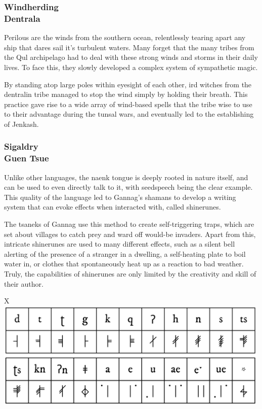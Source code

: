 
\subsubsection{Windherding\\ \small{Dentrala}} %
Perilous are the winds from the southern ocean, relentlessly tearing apart any ship that dares sail it's turbulent waters.
Many forget that the many tribes from the Qul archipelago had to deal with these strong winds and storms in their daily lives.
To face this, they slowly developed a complex system of sympathetic magic.

By standing atop large poles within eyesight of each other, ird witches from the dentralin tribe managed to stop the wind simply by holding their breath.
This practice gave rise to a wide array of wind-based spells that the tribe wise to use to their advantage during the tunsal wars, and eventually led to the establishing of Jenkash.

\subsubsection{Sigaldry\\ \small{Guen Tsue}} %
Unlike other languages, the naenk tongue is deeply rooted in nature itself, and can be used to even directly talk to it, with seedspeech being the clear example.
This quality of the language led to Gannag's shamans to develop a writing system that can evoke effects when interacted with, called shinerunes.

The tsaneks of Gannag use this method to create self-triggering traps, which are set about villages to catch prey and ward off would-be invaders.
Apart from this, intricate shinerunes are used to many different effects, such as a silent bell alerting of the presence of a stranger in a dwelling, a self-heating plate to boil water in, or clothes that spontaneously heat up as a reaction to bad weather.
Truly, the capabilities of shinerunes are only limited by the creativity and skill of their author.

\begin{table}[t]%
    \begin{DndTable}[width=\linewidth, header=\centering Knaenese Alphabet]{X}
        \centering
        \includegraphics[width=0.99\textwidth]{01yuadrem/img/23knaenese_sample.png}
    \end{DndTable}
\end{table}

